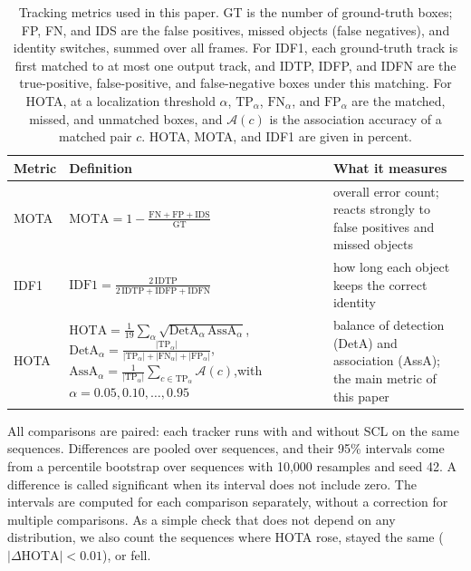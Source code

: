 \documentclass[pdflatex,sn-mathphys-num]{sn-jnl}
\newcommand{\scl}{SCL}
\begin{document}
\begin{table}[t]
\caption{Tracking metrics used in this paper. GT is the number of
ground-truth boxes; FP, FN, and IDS are the false positives, missed objects
(false negatives), and identity switches, summed over all frames. For IDF1,
each ground-truth track is first matched to at most one output track, and
IDTP, IDFP, and IDFN are the true-positive, false-positive, and
false-negative boxes under this matching. For HOTA, at a localization
threshold $\alpha$, $\mathrm{TP}_\alpha$, $\mathrm{FN}_\alpha$, and
$\mathrm{FP}_\alpha$ are the matched, missed, and unmatched boxes, and
$\mathcal{A}(c)$ is the association accuracy of a matched pair $c$. HOTA,
MOTA, and IDF1 are given in percent.}
\label{tab:metrics}
\centering\footnotesize
\setlength{\tabcolsep}{4pt}
\renewcommand{\arraystretch}{1.6}
\begin{tabular}{@{}l>{\raggedright\arraybackslash}p{68mm}>{\raggedright\arraybackslash}p{40mm}@{}}
\toprule
Metric & Definition & What it measures\\
\midrule
MOTA \cite{bernardin2008clear} & $\displaystyle \mathrm{MOTA}=1-\frac{\mathrm{FN}+\mathrm{FP}+\mathrm{IDS}}{\mathrm{GT}}$ & overall error count; reacts strongly to false positives and missed objects\\
IDF1 \cite{ristani2016idf1} & $\displaystyle \mathrm{IDF1}=\frac{2\,\mathrm{IDTP}}{2\,\mathrm{IDTP}+\mathrm{IDFP}+\mathrm{IDFN}}$ & how long each object keeps the correct identity\\
HOTA \cite{luiten2021hota} & $\displaystyle \mathrm{HOTA}=\frac{1}{19}\sum_{\alpha}\sqrt{\mathrm{DetA}_\alpha\,\mathrm{AssA}_\alpha}$,\newline $\displaystyle \mathrm{DetA}_\alpha=\frac{|\mathrm{TP}_\alpha|}{|\mathrm{TP}_\alpha|+|\mathrm{FN}_\alpha|+|\mathrm{FP}_\alpha|}$,\newline $\displaystyle \mathrm{AssA}_\alpha=\frac{1}{|\mathrm{TP}_\alpha|}\sum_{c\in\mathrm{TP}_\alpha}\mathcal{A}(c)$,\newline with $\alpha=0.05,0.10,\dots,0.95$ & balance of detection (DetA) and association (AssA); the main metric of this paper\\
\bottomrule
\end{tabular}
\end{table}

All comparisons are paired: each tracker runs with and without \scl{} on
the same sequences. Differences are pooled over sequences, and their 95\%
intervals come from a percentile bootstrap over sequences
\cite{efron1993bootstrap} with 10,000 resamples and seed 42. A difference is
called significant when its interval does not include zero. The intervals
are computed for each comparison separately, without a correction for
multiple comparisons. As a simple
check that does not depend on any distribution, we also count the sequences
where HOTA rose, stayed the same ($|\Delta\mathrm{HOTA}|<0.01$), or fell.
\end{document}
